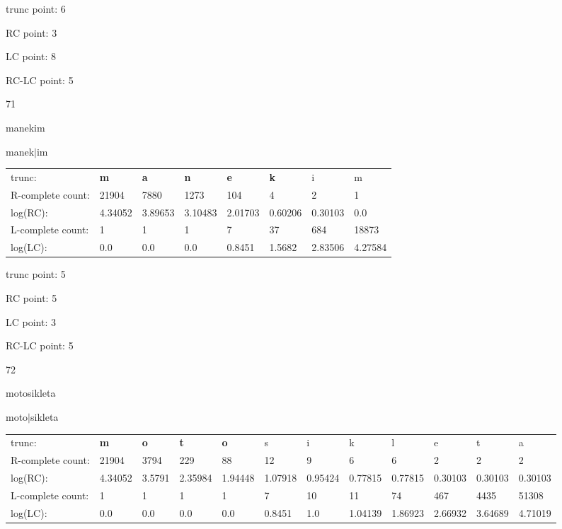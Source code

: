 \documentclass{article}
\begin{document}
trunc point: 6

RC point: 3

LC point: 8

RC-LC point: 5

\vspace{3em}



71

manekim

manek$|$im

\vspace{1em}

\begin{tabular}{l|lllllll}

trunc: & {\color{red}\bf m} & {\color{red}\bf a} & {\color{red}\bf n} & {\color{red}\bf e} & {\color{red}\bf k} & i & m \\ 
R-complete count: & 21904 & 7880 & 1273 & 104 & 4 & 2 & 1 \\ 
log(RC): & 4.34052 & 3.89653 & 3.10483 & 2.01703 & 0.60206 & 0.30103 & 0.0 \\ 
L-complete count: & 1 & 1 & 1 & 7 & 37 & 684 & 18873 \\ 
log(LC): & 0.0 & 0.0 & 0.0 & 0.8451 & 1.5682 & 2.83506 & 4.27584 \\ 
\end{tabular}

trunc point: 5

RC point: 5

LC point: 3

RC-LC point: 5

\vspace{3em}



72

motosikleta

moto$|$sikleta

\vspace{1em}

\begin{tabular}{l|lllllllllll}

trunc: & {\color{red}\bf m} & {\color{red}\bf o} & {\color{red}\bf t} & {\color{red}\bf o} & s & i & k & l & e & t & a \\ 
R-complete count: & 21904 & 3794 & 229 & 88 & 12 & 9 & 6 & 6 & 2 & 2 & 2 \\ 
log(RC): & 4.34052 & 3.5791 & 2.35984 & 1.94448 & 1.07918 & 0.95424 & 0.77815 & 0.77815 & 0.30103 & 0.30103 & 0.30103 \\ 
L-complete count: & 1 & 1 & 1 & 1 & 7 & 10 & 11 & 74 & 467 & 4435 & 51308 \\ 
log(LC): & 0.0 & 0.0 & 0.0 & 0.0 & 0.8451 & 1.0 & 1.04139 & 1.86923 & 2.66932 & 3.64689 & 4.71019 \\ 
\end{tabular}
\end{document}

